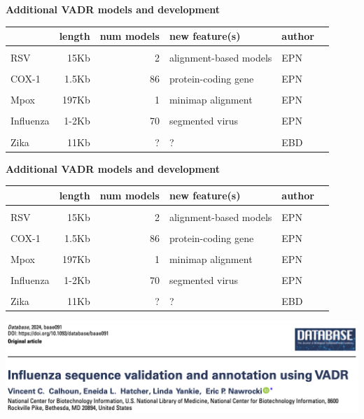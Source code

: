 \documentclass[landscape]{slides}
\begin{document}
\begin{slide}
\begin{center}
  \textbf{Additional VADR models and development}

\small
\begin{tabular}{l|r|r|l|l|l}
 & length & num models & new feature(s) & author\\ \hline
 & & & & & \\ 
RSV & 15Kb & 2 & alignment-based models & EPN \\
 & & & & & \\ 
COX-1 & 1.5Kb & 86 & protein-coding gene & EPN \\
 & & & & & \\ 
Mpox & 197Kb & 1 & minimap alignment & EPN \\
 & & & & & \\ 
Influenza & 1-2Kb & 70 & segmented virus & EPN \\
 & & & & & \\ 
Zika      & 11Kb & ? & ? & EBD \\
\end{tabular}


\end{center}
  \vfill
\end{slide}
\begin{slide}
\begin{center}
  \textbf{Additional VADR models and development}

\small
\begin{tabular}{l|r|r|l|l|l}
 & length & num models & new feature(s) & author\\ \hline
 & & & & & \\ 
RSV & 15Kb & 2 & alignment-based models & EPN \\
 & & & & & \\ 
COX-1 & 1.5Kb & 86 & protein-coding gene & EPN \\
 & & & & & \\ 
Mpox & 197Kb & 1 & minimap alignment & EPN \\
 & & & & & \\ 
Influenza & 1-2Kb & 70 & segmented virus & EPN \\
 & & & & & \\ 
Zika      & 11Kb & ? & ? & EBD \\
\end{tabular}

\includegraphics[width=10.5in]{figs/vadr-flu-paper}

\end{center}
  \vfill
\end{slide}
\end{document}
